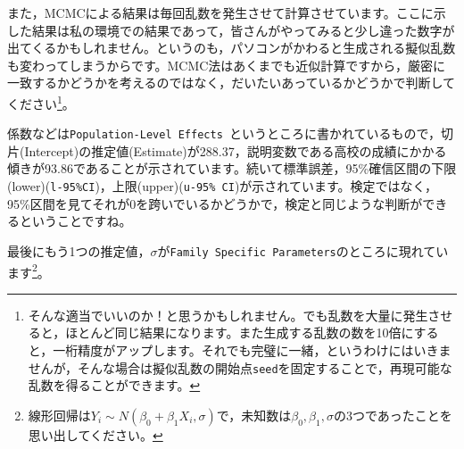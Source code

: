 \documentclass{ltjbook}
\begin{document}
また，MCMCによる結果は毎回乱数を発生させて計算させています。ここに示した結果は私の環境での結果であって，皆さんがやってみると少し違った数字が出てくるかもしれません。というのも，パソコンがかわると生成される擬似乱数も変わってしまうからです。MCMC法はあくまでも近似計算ですから，厳密に一致するかどうかを考えるのではなく，だいたいあっているかどうかで判断してください\footnote{そんな適当でいいのか！と思うかもしれません。でも乱数を大量に発生させると，ほとんど同じ結果になります。また生成する乱数の数を10倍にすると，一桁精度がアップします。それでも完璧に一緒，というわけにはいきませんが，そんな場合は擬似乱数の開始点\texttt{seed}を固定することで，再現可能な乱数を得ることができます。}。

係数などは\texttt{Population-Level Effects }というところに書かれているもので，切片(Intercept)の推定値(Estimate)が288.37，説明変数である高校の成績にかかる傾きが93.86であることが示されています。続いて標準誤差，95\%確信区間の下限(lower)(\texttt{l-95\%CI})，上限(upper)(\texttt{u-95\% CI})が示されています。検定ではなく，95\%区間を見てそれが0を跨いでいるかどうかで，検定と同じような判断ができるということですね。

最後にもう1つの推定値，$\sigma$が\texttt{Family Specific Parameters}のところに現れています\footnote{線形回帰は$Y_i \sim N(\beta_0 + \beta_1 X_i , \sigma)$で，未知数は$\beta_0,\beta_1,\sigma$の3つであったことを思い出してください。}。
\end{document}

